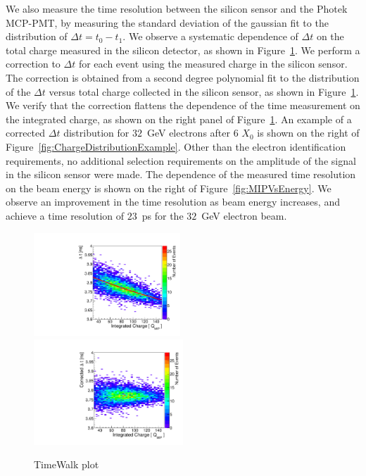\documentclass[12pt]{article}
\begin{document}
{We also measure the time resolution between the silicon sensor and the Photek
MCP-PMT, by measuring the standard deviation of the gaussian fit to the
distribution of $\Delta t = t_0-t_1$. We observe a systematic dependence of
$\Delta t$ on the total charge measured in the silicon detector, as shown in
Figure~\ref{fig:timewalk}. We perform a correction to $\Delta t$ for each event
using the measured charge in the silicon sensor. The correction is obtained from
a second degree polynomial fit to the distribution of the $\Delta t$ versus
total charge collected in the silicon sensor, as shown in
Figure~\ref{fig:timewalk}. We verify that the correction flattens the dependence
of the time measurement on the integrated charge, as shown on the right panel of
Figure~\ref{fig:timewalk}. An example of a corrected $\Delta t$ distribution for
$32$~GeV electrons after 6 $X_0$ is shown on the right of
Figure~\ref{fig:ChargeDistributionExample}. Other than the electron identification
requirements, no additional selection requirements on the amplitude of the
signal in the silicon sensor were made. The dependence of the measured time
resolution on the beam energy is shown on the right of
Figure~\ref{fig:MIPVsEnergy}. We observe an improvement in the time resolution
as beam energy increases, and achieve a time resolution of $23$~ps for the
$32$~GeV electron beam.

\begin{figure}[htbp] 
\centering
\includegraphics[width=0.49\textwidth]{plots/DeltaT_vs_Charge_Uncorrected.pdf} 
\includegraphics[width=0.5\textwidth]{plots/DeltaT_vs_Charge_Corrected.pdf} 
\caption{TimeWalk plot} 
\label{fig:timewalk} 
\end{figure} 

}
\end{document}
